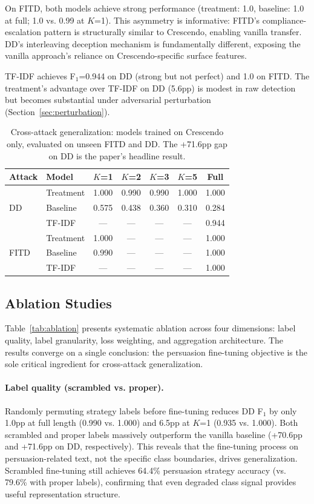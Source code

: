 \documentclass[11pt,a4paper]{article}
\newcommand{\fone}{F$_1$}
\begin{document}
On FITD, both models achieve strong performance (treatment: 1.0, baseline: 1.0 at full; 1.0 vs. 0.99 at $K$=1).
This asymmetry is informative: FITD's compliance-escalation pattern is structurally similar to Crescendo, enabling vanilla transfer.
DD's interleaving deception mechanism is fundamentally different, exposing the vanilla approach's reliance on Crescendo-specific surface features.

TF-IDF achieves \fone{}=0.944 on DD (strong but not perfect) and 1.0 on FITD.
The treatment's advantage over TF-IDF on DD (5.6pp) is modest in raw detection but becomes substantial under adversarial perturbation (Section~\ref{sec:perturbation}).

\begin{table}[t]
\centering
\caption{Cross-attack generalization: models trained on Crescendo only, evaluated on unseen FITD and DD. The +71.6pp gap on DD is the paper's headline result.}
\label{tab:cross_attack}
\begin{tabular}{llccccc}
\toprule
Attack & Model & $K$=1 & $K$=2 & $K$=3 & $K$=5 & Full \\
\midrule
\multirow{3}{*}{DD}
  & Treatment & 1.000 & 0.990 & 0.990 & 1.000 & 1.000 \\
  & Baseline  & 0.575 & 0.438 & 0.360 & 0.310 & 0.284 \\
  & TF-IDF    & --- & --- & --- & --- & 0.944 \\
\midrule
\multirow{3}{*}{FITD}
  & Treatment & 1.000 & --- & --- & --- & 1.000 \\
  & Baseline  & 0.990 & --- & --- & --- & 1.000 \\
  & TF-IDF    & --- & --- & --- & --- & 1.000 \\
\bottomrule
\end{tabular}
\end{table}

\subsection{Ablation Studies}
\label{sec:ablation}

Table~\ref{tab:ablation} presents systematic ablation across four dimensions: label quality, label granularity, loss weighting, and aggregation architecture.
The results converge on a single conclusion: the persuasion fine-tuning objective is the sole critical ingredient for cross-attack generalization.

\paragraph{Label quality (scrambled vs. proper).}
Randomly permuting strategy labels before fine-tuning reduces DD \fone{} by only 1.0pp at full length (0.990 vs. 1.000) and 6.5pp at $K$=1 (0.935 vs. 1.000).
Both scrambled and proper labels massively outperform the vanilla baseline (+70.6pp and +71.6pp on DD, respectively).
This reveals that the fine-tuning process on persuasion-related text, not the specific class boundaries, drives generalization.
Scrambled fine-tuning still achieves 64.4\% persuasion strategy accuracy (vs. 79.6\% with proper labels), confirming that even degraded class signal provides useful representation structure.
\end{document}
